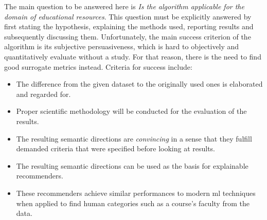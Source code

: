 The main question to be answered here is \textit{Is the algorithm applicable for the domain of educational resources}. This question must be explicitly answered by first stating the hypothesis, explaining the methods used, reporting results and subsequently discussing them. Unfortunately, the main success criterion of the algorithm is its subjective persuasiveness, which is hard to objectively and quantitatively evaluate without a study. For that reason, there is the need to find good surrogate metrics instead. Criteria for success include:

\begin{itemize}
    \item The difference from the given dataset to the originally used ones is elaborated and regarded for.
    \item Proper scientific methodology will be conducted for the evaluation of the results.
    \item The resulting semantic directions are \textit{convincing} in a sense that they fulfill demanded criteria that were specified before looking at results.
    \item The resulting semantic directions can be used as the basis for explainable recommenders.
    \item These recommenders achieve similar performances to modern \gls{ml} techniques when applied to find human categories such as a course's faculty from the data.
\end{itemize}


